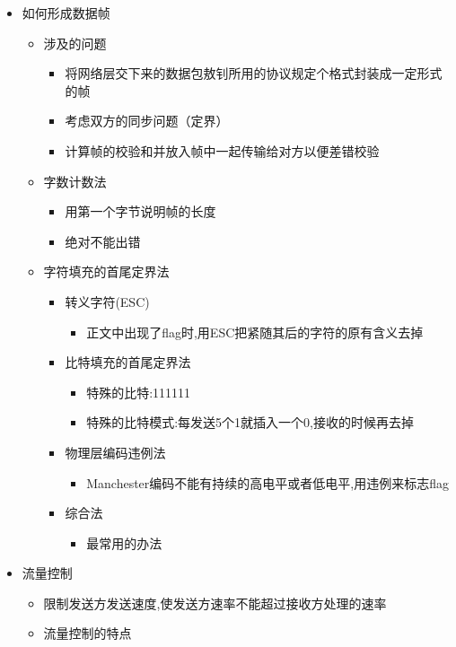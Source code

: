 \documentclass[a4paper,12pt,notitlepage]{article}
\begin{document}
\begin{itemize}
\begin{itemize}
	\end{itemize}
	\item 如何形成数据帧
	\begin{itemize}
		\item 涉及的问题
		\begin{itemize}
			\item 将网络层交下来的数据包敖钊所用的协议规定个格式封装成一定形式的帧
			\item 考虑双方的同步问题（定界）
			\item 计算帧的校验和并放入帧中一起传输给对方以便差错校验
		\end{itemize}
		\item 字数计数法
		\begin{itemize}
			\item 用第一个字节说明帧的长度
			\item 绝对不能出错
		\end{itemize}
		\item 字符填充的首尾定界法
		\begin{itemize}
			\item 转义字符(ESC)
			\begin{itemize}
				\item 正文中出现了flag时,用ESC把紧随其后的字符的原有含义去掉
			\end{itemize}
			\item 比特填充的首尾定界法
			\begin{itemize}
				\item 特殊的比特:111111
				\item 特殊的比特模式:每发送5个1就插入一个0,接收的时候再去掉
			\end{itemize}
			\item 物理层编码违例法
			\begin{itemize}
				\item Manchester编码不能有持续的高电平或者低电平,用违例来标志flag
			\end{itemize}
			\item 综合法
			\begin{itemize}
				\item 最常用的办法
			\end{itemize}
		\end{itemize}
	\end{itemize}
	\item 流量控制
	\begin{itemize}
		\item 限制发送方发送速度,使发送方速率不能超过接收方处理的速率
		\item 流量控制的特点

\end{itemize}
\end{itemize}
\end{document}
